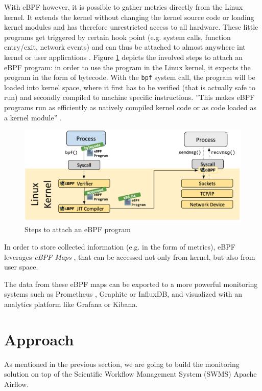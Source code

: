 \documentclass[lettersize,journal]{IEEEtran}
\begin{document}
	With eBPF \cite{ebpf} however, it is possible to gather metrics directly from the Linux kernel. It extends the kernel without changing the kernel source code or loading kernel modules and has therefore unrestricted access to all hardware. These little programs get triggered by certain hook point (e.g. system calls, function entry/exit, network events) and can thus be attached to almost anywhere int kernel or user applications \cite{whatebpf}. 
	Figure \ref{fig:ebpf:steps} depicts the involved steps to attach an eBPF program: in order to use the program in the Linux kernel, it expects the program in the form of bytecode. With the \texttt{bpf} system call, the program will be loaded into kernel space, where it first has to be verified (that is actually safe to run) and secondly compiled to machine specific instructions. ''This makes eBPF programs run as efficiently as natively compiled kernel code or as code loaded as a kernel module'' \cite{whatebpf}.
	\begin{figure}[h]
		\includegraphics[width=\linewidth]{images/ebpf-steps.png}
		\caption{Steps to attach an eBPF program \cite{whatebpf}}
		\label{fig:ebpf:steps}
	\end{figure}
	In order to store collected information (e.g. in the form of metrics), eBPF leverages \textit{eBPF Maps} \cite{ebpfMaps}, that can be accessed not only from kernel, but also from user space.
	
	The data from these eBPF maps can be exported to a more powerful monitoring systems such as Prometheus \cite{prometheus}, Graphite or InfluxDB, and  visualized with an analytics platform like Grafana or Kibana.
	
	
	\section{Approach}
	As mentioned in the previous section, we are going to build the monitoring solution on top of the Scientific Workflow Management System (SWMS) Apache Airflow. 
	
\end{document}
